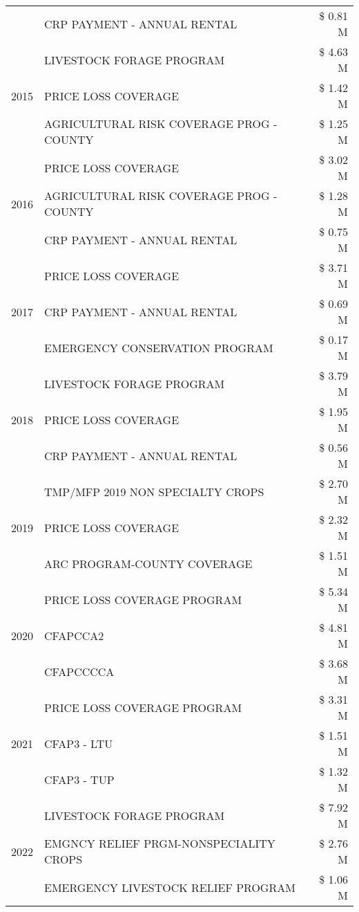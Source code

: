 \begin{tabular}{llr}
 & CRP PAYMENT - ANNUAL RENTAL & \$ 0.81 M \\
\cline{1-3}
\multirow[t]{3}{*}{2015} & LIVESTOCK FORAGE PROGRAM & \$ 4.63 M \\
 & PRICE LOSS COVERAGE & \$ 1.42 M \\
 & AGRICULTURAL RISK COVERAGE PROG - COUNTY & \$ 1.25 M \\
\cline{1-3}
\multirow[t]{3}{*}{2016} & PRICE LOSS COVERAGE & \$ 3.02 M \\
 & AGRICULTURAL RISK COVERAGE PROG - COUNTY & \$ 1.28 M \\
 & CRP PAYMENT - ANNUAL RENTAL & \$ 0.75 M \\
\cline{1-3}
\multirow[t]{3}{*}{2017} & PRICE LOSS COVERAGE & \$ 3.71 M \\
 & CRP PAYMENT - ANNUAL RENTAL & \$ 0.69 M \\
 & EMERGENCY CONSERVATION PROGRAM & \$ 0.17 M \\
\cline{1-3}
\multirow[t]{3}{*}{2018} & LIVESTOCK FORAGE PROGRAM & \$ 3.79 M \\
 & PRICE LOSS COVERAGE & \$ 1.95 M \\
 & CRP PAYMENT - ANNUAL RENTAL & \$ 0.56 M \\
\cline{1-3}
\multirow[t]{3}{*}{2019} & TMP/MFP 2019 NON SPECIALTY CROPS & \$ 2.70 M \\
 & PRICE LOSS COVERAGE & \$ 2.32 M \\
 & ARC PROGRAM-COUNTY COVERAGE & \$ 1.51 M \\
\cline{1-3}
\multirow[t]{3}{*}{2020} & PRICE LOSS COVERAGE PROGRAM & \$ 5.34 M \\
 & CFAPCCA2 & \$ 4.81 M \\
 & CFAPCCCCA & \$ 3.68 M \\
\cline{1-3}
\multirow[t]{3}{*}{2021} & PRICE LOSS COVERAGE PROGRAM & \$ 3.31 M \\
 & CFAP3 - LTU & \$ 1.51 M \\
 & CFAP3 - TUP & \$ 1.32 M \\
\cline{1-3}
\multirow[t]{3}{*}{2022} & LIVESTOCK FORAGE PROGRAM & \$ 7.92 M \\
 & EMGNCY RELIEF PRGM-NONSPECIALITY CROPS & \$ 2.76 M \\
 & EMERGENCY LIVESTOCK RELIEF PROGRAM & \$ 1.06 M \\
\cline{1-3}
\bottomrule
\end{tabular}
